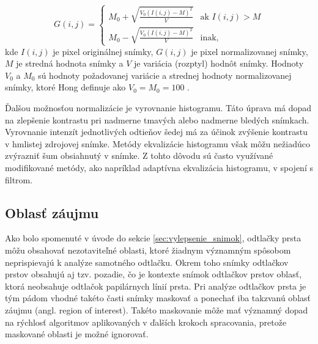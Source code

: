   \begin{equation}
    G(i,j) =
    \begin{cases}
      M_0 + \sqrt{\frac{V_0 (I(i,j)-M)^2}{V}}  & \text{ak } I(i,j) > M \\
      M_0 - \sqrt{\frac{V_0 (I(i,j)-M)^2}{V}} & \text{inak,}
    \end{cases}
    \label{eq:normalizacia_Hong}
  \end{equation}
  kde $I(i,j)$ je pixel originálnej snímky, $G(i,j)$ je pixel normalizovanej snímky, $M$ je stredná hodnota snímky a $V$ je variácia (rozptyl) hodnôt snímky.
  Hodnoty $V_0$ a $M_0$ sú hodnoty požadovanej variácie a strednej hodnoty normalizovanej snímky, ktoré Hong definuje ako $V_0 = M_0 = 100$ \cite{Hong}.

  Ďalšou možnosťou normalizácie je vyrovnanie histogramu. Táto úprava má dopad na zlepšenie kontrastu pri nadmerne tmavých
  alebo nadmerne bledých snímkach. Vyrovnanie intenzít jednotlivých odtieňov šedej má za účinok zvýšenie kontrastu v hmlistej zdrojovej snímke.
  Metódy ekvalizácie histogramu však môžu nežiadúco zvýrazniť šum obsiahnutý v snímke. Z tohto dôvodu sú často využívané modifikované metódy,
  ako napríklad adaptívna ekvalizácia histogramu, v spojení s filtrom.

  \subsection{Oblasť záujmu}
  Ako bolo spomenuté v úvode do sekcie \ref{sec:vylepsenie_snimok}, odtlačky prsta môžu obsahovať nezotaviteľné oblasti, ktoré žiadnym významným spôsobom
  neprispievajú k analýze samotného odtlačku. Okrem toho snímky odtlačkov prstov obsahujú aj tzv. pozadie, čo je kontexte snímok odtlačkov prstov oblasť,
  ktorá neobsahuje odtlačok papilárnych línií prsta. Pri analýze odtlačkov prsta je tým pádom vhodné takéto časti snímky maskovať a ponechať iba takzvanú
  oblasť záujmu (angl. region of interest). Takéto maskovanie môže mať významný dopad na rýchlosť algoritmov aplikovaných v ďalších krokoch spracovania,
  pretože maskované oblasti je možné ignorovať.

